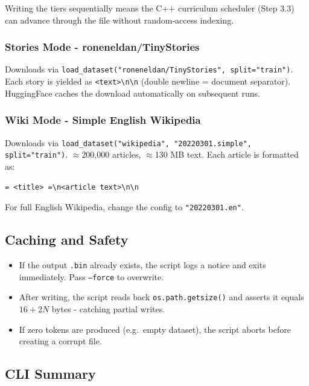 \documentclass[12pt, a4paper]{article}
\begin{document}
Writing the tiers sequentially means the C++ curriculum scheduler (Step 3.3)
can advance through the file without random-access indexing.

\subsubsection{Stories Mode - roneneldan/TinyStories}

Downloads via \texttt{load\_dataset("roneneldan/TinyStories", split="train")}.
Each story is yielded as \texttt{<text>\textbackslash n\textbackslash n} (double newline = document separator).
HuggingFace caches the download automatically on subsequent runs.

\subsubsection{Wiki Mode - Simple English Wikipedia}

Downloads via \texttt{load\_dataset("wikipedia", "20220301.simple", split="train")}.
$\approx$200,000 articles, $\approx$130 MB text.  Each article is formatted as:
\begin{center}
\texttt{= <title> =\textbackslash n<article text>\textbackslash n\textbackslash n}
\end{center}
For full English Wikipedia, change the config to \texttt{"20220301.en"}.

\subsection{Caching and Safety}

\begin{itemize}
  \item If the output \texttt{.bin} already exists, the script logs a notice
        and exits immediately.  Pass \texttt{--force} to overwrite.
  \item After writing, the script reads back \texttt{os.path.getsize()} and
        asserts it equals $16 + 2N$ bytes - catching partial writes.
  \item If zero tokens are produced (e.g.\ empty dataset), the script aborts
        before creating a corrupt file.
\end{itemize}

\subsection{CLI Summary}
\end{document}
